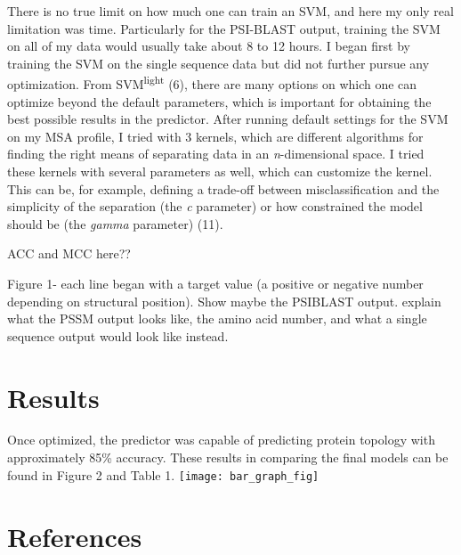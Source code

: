 \documentclass{article}
\begin{document}
There is no true limit on how much one can train an SVM, and here my only real limitation was time. Particularly for the PSI-BLAST output, training the SVM on all of my data would usually take about 8 to 12 hours. I began first by training the SVM on the single sequence data but did not further pursue any optimization. From SVM\textsuperscript{light} (6), there are many options on which one can optimize beyond the default parameters, which is important for obtaining the best possible results in the predictor.  After running default settings for the SVM on my MSA profile, I tried with 3 kernels, which are different algorithms for finding the right means of separating data in an \textit{n}-dimensional space. I tried these kernels with several parameters as well, which can customize the kernel. This can be, for example, defining a trade-off between misclassification and the simplicity of the separation (the \textit{c} parameter) or how constrained the model should be (the \textit{gamma} parameter) (11). 

ACC and MCC here?? 

Figure 1- each line began with a target value (a positive or negative number depending on structural position). Show maybe the PSIBLAST output. explain what the PSSM output looks like, the amino acid number, and what a single sequence output would look like instead. 


\section{Results}

Once optimized, the predictor was capable of predicting protein topology with approximately 85\% accuracy. These results in comparing the final models can be found in Figure 2 and Table 1. \texttt{[image: bar\_graph\_fig]}












\section{References}
\end{document}
